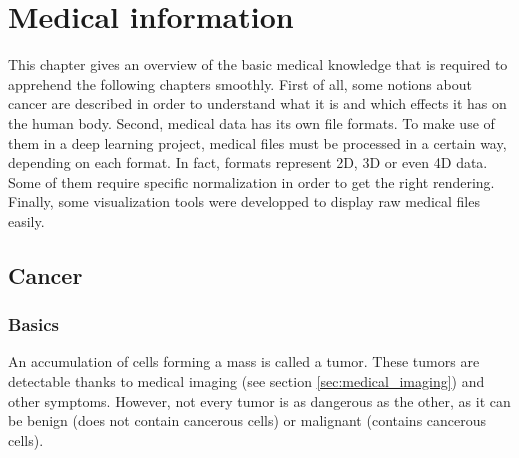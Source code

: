 
\chapter{Medical information}
\label{ch:medical}
This chapter gives an overview of the basic medical knowledge that is required to apprehend the following chapters smoothly. First of all, some notions about cancer are described in order to understand what it is and which effects it has on the human body. Second, medical data has its own file formats. To make use of them in a deep learning project, medical files must be processed in a certain way, depending on each format. In fact, formats represent 2D, 3D or even 4D data. Some of them require specific normalization in order to get the right rendering. Finally, some visualization tools were developped to display raw medical files easily. 


\section{Cancer}
\subsection{Basics}
An accumulation of cells forming a mass is called a tumor. These tumors are detectable thanks to medical imaging (see section \ref{sec:medical_imaging}) and other symptoms. However, not every tumor is as dangerous as the other, as it can be benign (does not contain cancerous cells) or malignant (contains cancerous cells).

